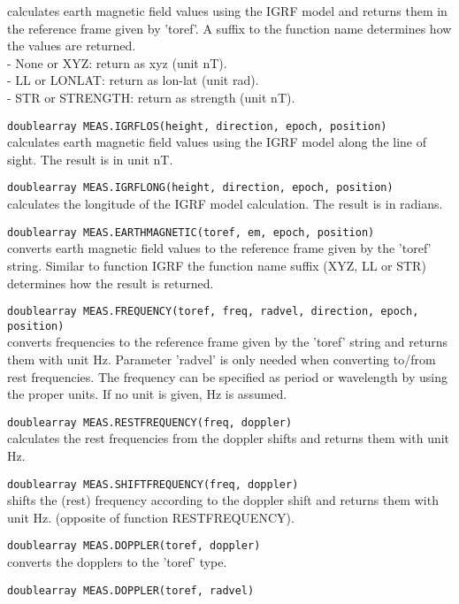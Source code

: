 \begin{description}
    calculates earth magnetic field values using the IGRF model and
    returns them in the reference frame given by 'toref'.
    A suffix to the function name determines how the values are returned.
    \\ - None or XYZ: return as xyz (unit nT).
    \\ - LL or LONLAT: return as lon-lat (unit rad).
    \\ - STR or STRENGTH: return as strength (unit nT).
  \item[] \texttt{doublearray MEAS.IGRFLOS(height, direction, epoch, position)}\\
    calculates earth magnetic field values using the IGRF model along
    the line of sight. The result is in unit nT.
  \item[] \texttt{doublearray MEAS.IGRFLONG(height, direction, epoch, position)}\\
    calculates the longitude of the IGRF model calculation. The result
    is in radians.
  \item[] \texttt{doublearray MEAS.EARTHMAGNETIC(toref, em, epoch, position)}\\
    converts earth magnetic field values to the reference frame given by the 'toref'
    string. Similar to function IGRF the function name suffix (XYZ, LL or STR)
    determines how the result is returned.
  \item[] \texttt{doublearray MEAS.FREQUENCY(toref, freq, radvel, direction, epoch, position)}\\
    converts frequencies to the reference frame given by the 'toref'
    string and returns them with unit Hz.
    Parameter 'radvel' is only needed when converting to/from rest frequencies.
    The frequency can be specified as period or wavelength by using
    the proper units. If no unit is given, Hz is assumed.
  \item[] \texttt{doublearray MEAS.RESTFREQUENCY(freq, doppler)}\\
    calculates the rest frequencies from the doppler shifts and
    returns them with unit Hz.
  \item[] \texttt{doublearray MEAS.SHIFTFREQUENCY(freq, doppler)}\\
    shifts the (rest) frequency according to the doppler shift and
    returns them with unit Hz.
    (opposite of function RESTFREQUENCY).
  \item[] \texttt{doublearray MEAS.DOPPLER(toref, doppler)}\\
    converts the dopplers to the 'toref' type.
  \item[] \texttt{doublearray MEAS.DOPPLER(toref, radvel)}\\

\end{description}
